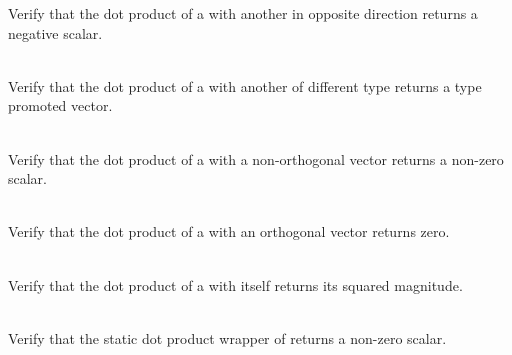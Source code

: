 \begin{DoxyRefList}
%
Verify that the dot product of a  with another  in opposite direction returns a negative scalar.  
\item[{\parbox[t]{\linewidth}{Member \doxylink{group___f_g_m___vec4___dot_ga26e51f21b6148a59ce7e29928ed19309}{Vector4\+DDot\+Product\+\_\+\+Mixed\+Type\+Dot\+Product\+Promotes\+Type} ()}}]\hfill \\
\label{test__test000124}%
%
Verify that the dot product of a  with another  of different type returns a type promoted vector.  
\item[{\parbox[t]{\linewidth}{Member \doxylink{group___f_g_m___vec4___dot_gaa436dd759231daf72a9de66f38b55581}{Vector4\+DDot\+Product\+\_\+\+Non\+Orthogonal\+Dot\+Product\+Returns\+Non\+Zero\+Scalar} ()}}]\hfill \\
\label{test__test000121}%
%
Verify that the dot product of a  with a non-\/orthogonal vector returns a non-\/zero scalar.  
\item[{\parbox[t]{\linewidth}{Member \doxylink{group___f_g_m___vec4___dot_ga9dcbc7ae9fb013209a64e07340fa4d97}{Vector4\+DDot\+Product\+\_\+\+Orthogonal\+Dot\+Product\+Return\+Zero} ()}}]\hfill \\
\label{test__test000120}%
%
Verify that the dot product of a  with an orthogonal vector returns zero.  
\item[{\parbox[t]{\linewidth}{Member \doxylink{group___f_g_m___vec4___dot_ga6365818c2ecff1a205344fbda9567bd9}{Vector4\+DDot\+Product\+\_\+\+Self\+Dot\+Product\+Returns\+Square\+Magnitude} ()}}]\hfill \\
\label{test__test000119}%
%
Verify that the dot product of a  with itself returns its squared magnitude.  
\item[{\parbox[t]{\linewidth}{Member \doxylink{group___f_g_m___vec4___dot_ga256b4dd376ab96bfa500ffe679c8014a}{Vector4\+DDot\+Product\+\_\+\+Static\+Wrapper\+\_\+\+Non\+Orthogonal\+Dot\+Product\+Returns\+Non\+Zero\+Scalar} ()}}]\hfill \\
\label{test__test000122}%
%
Verify that the static dot product wrapper of  returns a non-\/zero scalar.  

\end{DoxyRefList}
